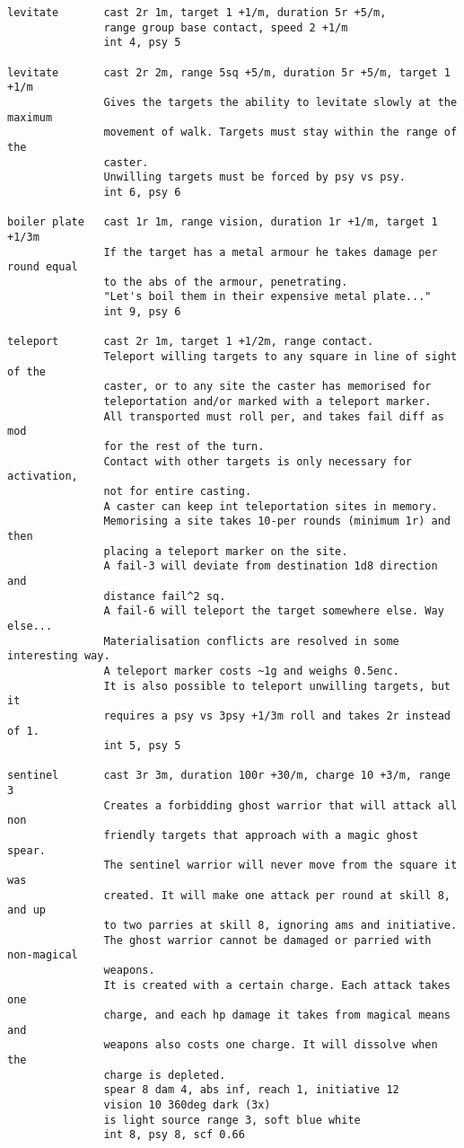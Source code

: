 \begin{verbatim}
levitate       cast 2r 1m, target 1 +1/m, duration 5r +5/m,
               range group base contact, speed 2 +1/m
               int 4, psy 5

levitate       cast 2r 2m, range 5sq +5/m, duration 5r +5/m, target 1 +1/m
               Gives the targets the ability to levitate slowly at the maximum
               movement of walk. Targets must stay within the range of the
               caster.
               Unwilling targets must be forced by psy vs psy.
               int 6, psy 6

boiler plate   cast 1r 1m, range vision, duration 1r +1/m, target 1 +1/3m
               If the target has a metal armour he takes damage per round equal
               to the abs of the armour, penetrating.
               "Let's boil them in their expensive metal plate..."
               int 9, psy 6

teleport       cast 2r 1m, target 1 +1/2m, range contact.
               Teleport willing targets to any square in line of sight of the
               caster, or to any site the caster has memorised for
               teleportation and/or marked with a teleport marker.
               All transported must roll per, and takes fail diff as mod
               for the rest of the turn.
               Contact with other targets is only necessary for activation,
               not for entire casting.
               A caster can keep int teleportation sites in memory.
               Memorising a site takes 10-per rounds (minimum 1r) and then
               placing a teleport marker on the site.
               A fail-3 will deviate from destination 1d8 direction and
               distance fail^2 sq.
               A fail-6 will teleport the target somewhere else. Way else...
               Materialisation conflicts are resolved in some interesting way.
               A teleport marker costs ~1g and weighs 0.5enc.
               It is also possible to teleport unwilling targets, but it
               requires a psy vs 3psy +1/3m roll and takes 2r instead of 1.
               int 5, psy 5

sentinel       cast 3r 3m, duration 100r +30/m, charge 10 +3/m, range 3
               Creates a forbidding ghost warrior that will attack all non
               friendly targets that approach with a magic ghost spear.
               The sentinel warrior will never move from the square it was
               created. It will make one attack per round at skill 8, and up
               to two parries at skill 8, ignoring ams and initiative.
               The ghost warrior cannot be damaged or parried with non-magical
               weapons.
               It is created with a certain charge. Each attack takes one
               charge, and each hp damage it takes from magical means and
               weapons also costs one charge. It will dissolve when the
               charge is depleted.
               spear 8 dam 4, abs inf, reach 1, initiative 12
               vision 10 360deg dark (3x)
               is light source range 3, soft blue white
               int 8, psy 8, scf 0.66


\end{verbatim}
